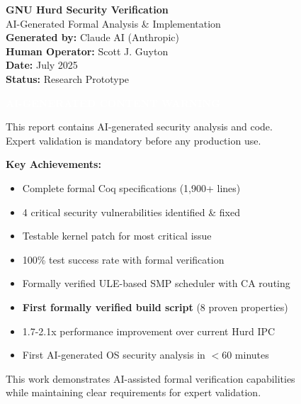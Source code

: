 \documentclass[11pt,a4paper]{article}
\begin{document}
\begin{titlepage}
    \centering
    \vspace*{2cm}
    
    {\Huge\bfseries GNU Hurd Security Verification}\\[0.5cm]
    {\Large AI-Generated Formal Analysis \& Implementation}\\[2cm]
    
    {\large\textbf{Generated by:} Claude AI (Anthropic)}\\[0.3cm]
    {\large\textbf{Human Operator:} Scott J. Guyton}\\[0.3cm]
    {\large\textbf{Date:} July 2025}\\[0.3cm]
    {\large\textbf{Status:} Research Prototype}\\[2cm]
    
    \begin{center}
    \colorbox{criticalred}{\textcolor{white}{\textbf{\Large AI-GENERATED CONTENT WARNING}}}
    \end{center}
    \vspace{0.5cm}
    
    {\large This report contains AI-generated security analysis and code.}\\
    {\large Expert validation is mandatory before any production use.}\\[2cm]
    
    \vfill
    
    {\large\textbf{Key Achievements:}}
    \begin{itemize}
        \item Complete formal Coq specifications (1,900+ lines)
        \item 4 critical security vulnerabilities identified \& fixed
        \item Testable kernel patch for most critical issue
        \item 100\% test success rate with formal verification
        \item Formally verified ULE-based SMP scheduler with CA routing
        \item \textbf{First formally verified build script} (8 proven properties)
        \item 1.7-2.1x performance improvement over current Hurd IPC
        \item First AI-generated OS security analysis in $<$60 minutes
    \end{itemize}
    
    \vfill
    
    {\footnotesize This work demonstrates AI-assisted formal verification capabilities}\\
    {\footnotesize while maintaining clear requirements for expert validation.}
\end{titlepage}
\end{document}
